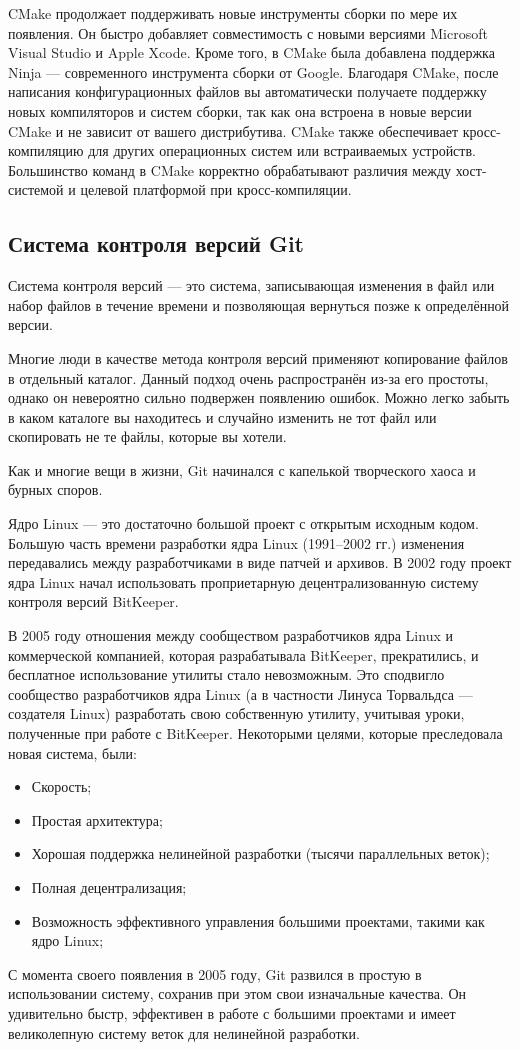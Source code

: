 CMake продолжает поддерживать новые инструменты сборки по мере их появления. Он быстро добавляет совместимость с новыми версиями Microsoft Visual Studio и Apple Xcode. Кроме того, в CMake была добавлена поддержка Ninja — современного инструмента сборки от Google. Благодаря CMake, после написания конфигурационных файлов вы автоматически получаете поддержку новых компиляторов и систем сборки, так как она встроена в новые версии CMake и не зависит от вашего дистрибутива. CMake также обеспечивает кросс-компиляцию для других операционных систем или встраиваемых устройств. Большинство команд в CMake корректно обрабатывают различия между хост-системой и целевой платформой при кросс-компиляции.

\subsection{Система контроля версий Git}

Система контроля версий — это система, записывающая изменения в файл или набор файлов в течение времени и позволяющая вернуться позже к определённой версии.

Многие люди в качестве метода контроля версий применяют копирование файлов в
отдельный каталог. Данный подход очень распространён из-за его простоты, однако он
невероятно сильно подвержен появлению ошибок. Можно легко забыть в каком каталоге
вы находитесь и случайно изменить не тот файл или скопировать не те файлы, которые вы
хотели.

Как и многие вещи в жизни, Git начинался с капелькой творческого хаоса и бурных споров.

Ядро Linux — это достаточно большой проект с открытым исходным кодом. Большую часть
времени разработки ядра Linux (1991–2002 гг.) изменения передавались между
разработчиками в виде патчей и архивов. В 2002 году проект ядра Linux начал использовать
проприетарную децентрализованную систему контроля версий BitKeeper.

В 2005 году отношения между сообществом разработчиков ядра Linux и коммерческой
компанией, которая разрабатывала BitKeeper, прекратились, и бесплатное использование
утилиты стало невозможным. Это сподвигло сообщество разработчиков ядра Linux (а в
частности Линуса Торвальдса — создателя Linux) разработать свою собственную утилиту,
учитывая уроки, полученные при работе с BitKeeper. Некоторыми целями, которые
преследовала новая система, были:
\begin{itemize}
	\item Скорость;
	\item Простая архитектура;
	\item Хорошая поддержка нелинейной разработки (тысячи параллельных веток);
	\item Полная децентрализация;
	\item Возможность эффективного управления большими проектами, такими как ядро Linux;
\end{itemize}
С момента своего появления в 2005 году, Git развился в простую в использовании систему, сохранив при этом свои изначальные качества. Он удивительно быстр, эффективен в работе с большими проектами и имеет великолепную систему веток для нелинейной разработки.

